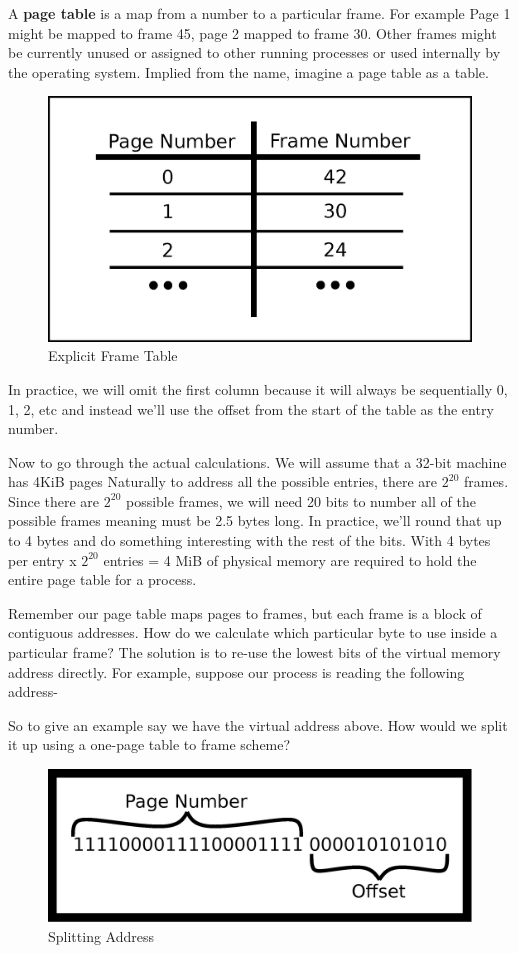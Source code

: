 A \textbf{page table} is a map from a number to a particular frame.
For example Page 1 might be mapped to frame 45, page 2 mapped to frame 30.
Other frames might be currently unused or assigned to other running processes or used internally by the operating system.
Implied from the name, imagine a page table as a table.

\begin{figure}[H]
  \centering
  \includegraphics[width=.5\textwidth]{ipc/drawings/frame_table.eps}
  \caption{Explicit Frame Table}
\end{figure}

In practice, we will omit the first column because it will always be sequentially 0, 1, 2, etc and instead we'll use the offset from the start of the table as the entry number.

Now to go through the actual calculations.
We will assume that a 32-bit machine has 4KiB pages
Naturally to address all the possible entries, there are $2^{20}$ frames.
Since there are $2^{20}$ possible frames, we will need 20 bits to number all of the possible frames meaning  must be 2.5 bytes long.
In practice, we'll round that up to 4 bytes and do something interesting with the rest of the bits.
With 4 bytes per entry x $2^{20}$ entries = 4 MiB of physical memory are required to hold the entire page table for a process.

Remember our page table maps pages to frames, but each frame is a block of contiguous addresses.
How do we calculate which particular byte to use inside a particular frame?
The solution is to re-use the lowest bits of the virtual memory address directly.
For example, suppose our process is reading the following address- 

So to give an example say we have the virtual address above.
How would we split it up using a one-page table to frame scheme?

\begin{figure}[H]
\centering
\includegraphics[width=.5\textwidth]{ipc/drawings/address_split.eps}
\caption{Splitting Address}
\end{figure}

